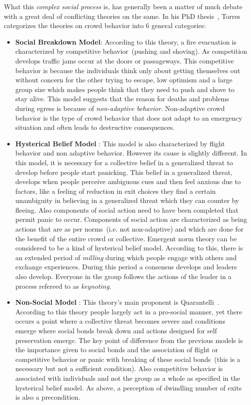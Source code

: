 What this \emph{complex social process} is, has generally been a matter of much debate with a great deal of conflicting theories on the same. In his PhD thesis~\cite{Torres:2010tj}, Torres categorizes the theories on crowd behavior into 6 general categories:
\begin{itemize}
\item {\bf Social Breakdown Model}: According to this theory, a fire evacuation is characterized by competitive behavior~(pushing and shoving). As competition develops traffic jams occur at the doors or passageways. This competitive behavior is because the individuals think only about getting themselves out without concern for the other trying to escape, low optimism and a large group size which makes people think that they need to push and shove to stay alive. This model suggests that the reason for deaths and problems during egress is because of \emph{non-adaptive behavior}. Non-adaptive crowd behavior is the type of crowd behavior that does not adapt to an emergency situation and often leads to destructive consequences.

\item {\bf Hysterical Belief Model }: This model is also characterized by flight behavior and non adaptive behavior. However its cause is slightly different. In this model, it is necessary for a collective belief in a generalized threat to develop before people start panicking. This belief in a generalized threat, develops when people perceive ambiguous cues and then feel anxious due to factors, like a feeling of reduction in exit choices they find a certain unambiguity in believing in a generalized threat which they can counter by fleeing. Also components of social action need to have been completed that permit panic to occur. Components of social action are characterized as being actions that are as per norms~(i.e. not non-adaptive) and which are done for the benefit of the entire crowd or collective. Emergent norm theory can be considered to be a kind of hysterical belief model. According to this, there is an extended period of \emph{milling} during which people engage with others and exchange experiences. During this period a consensus develops and leaders also develop. Everyone in the group follows the actions of the leader in a process refereed to as \emph{keynoting}.

\item {\bf Non-Social Model }: This theory's main proponent is Quarantelli~\cite{Quarantelli:1954vr}. According to this theory people largely act in a pro-social manner, yet there occurs a point where a collective threat becomes severe and conditions emerge where social bonds break down and actions designed for self preservation emerge. The key point of difference from the previous models is the importance given to social bonds and the association of flight or competitive behavior or panic with breaking of these social bonds~(this is a necessary but not a sufficient condition). Also competitive behavior is associated with individuals and not the group as a whole as specified in the hysterical belief model. As above, a perception of dwindling number of exits is also a precondition.


\end{itemize}
